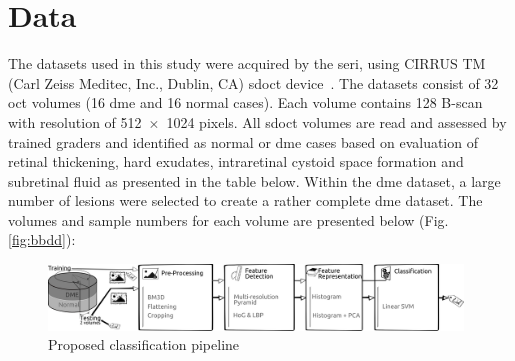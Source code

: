 \graphicspath{ {./content/method/figures/} }

\section{Data}\label{sec:data}

The datasets used in this study were acquired by the \gls{seri}, using CIRRUS TM (Carl Zeiss Meditec, Inc., Dublin, CA) \gls{sdoct} device~\cite{Chen2005}.
The datasets consist of 32 \gls{oct} volumes (16 \gls{dme} and 16 normal cases).
Each volume contains 128 B-scan with resolution of 512~$\times$~1024 pixels.
All \gls{sdoct} volumes are read and assessed by trained graders and identified as normal or \gls{dme} cases based on evaluation of retinal thickening, hard exudates, intraretinal cystoid space formation and subretinal fluid as presented in the table below.
Within the \gls{dme} dataset, a large number of lesions were selected to create a rather complete \gls{dme} dataset.
The volumes and sample numbers for each volume are presented below (Fig.\,\ref{fig:bbdd}):

\begin{figure}[t]
\centering
        \includegraphics[width = 0.98\textwidth]{khaled_embc}
\caption{Proposed classification pipeline}
\label{fig:fig3}
\end{figure}

